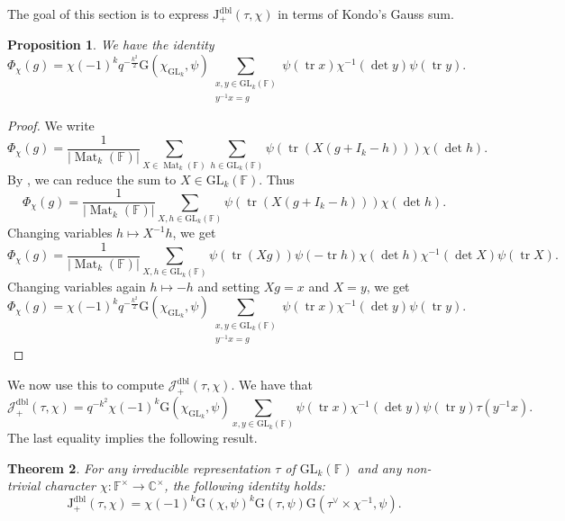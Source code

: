 \documentclass[12pt, reqno]{amsart}
\newtheorem{theorem}{Theorem}[section]
\newtheorem{proposition}[theorem]{Proposition}
\theoremstyle{definition}
\theoremstyle{definition}
\theoremstyle{definition}
\newcommand{\cComplex}{\mathbb{C}}
\newcommand{\multiplicativegroup}[1]{#1^{\times}}
\newcommand{\sizeof}[1]{\left|#1\right|}
\newcommand{\fieldCharacter}{\psi}
\newcommand{\IdentityMatrix}[1]{I_{#1}}
\newcommand{\trace}{\operatorname{tr}}
\newcommand{\GL}{\mathrm{GL}}
\newcommand{\finiteField}{\mathbb{F}}
\newcommand{\squareMatrix}{\operatorname{Mat}}
\newcommand{\posDblJacobiSum}[2]{\mathcal{J}_{+}^{\mathrm{dbl}}\left(#1, #2\right)}
\newcommand{\GaussSumScalar}[2]{\mathrm{G}\left(#1, #2\right)}
\newcommand{\posDblJacobiSumScalar}[2]{\mathrm{J}_{+}^{\mathrm{dbl}}\left(#1, #2\right)}
\begin{document}
The goal of this section is to express $\posDblJacobiSumScalar{\tau}{\chi}$ in terms of Kondo's Gauss sum.

\begin{proposition}\label{prop:doubling-for-gln-in-terms-of-kondo}
	We have the identity
	$$\Phi_{\chi}\left(g\right) = \chi\left(-1\right)^k q^{-\frac{k^2}{2}} \GaussSumScalar{\chi_{\GL_k}}{\fieldCharacter} \sum_{\substack{x, y \in \GL_k\left(\finiteField\right)\\
			y^{-1} x = g}} \fieldCharacter\left(\trace x\right) \chi^{-1}\left(\det y\right) \fieldCharacter\left(\trace y\right).$$
\end{proposition}
\begin{proof}
	We write $$\Phi_{\chi}\left(g\right) = \frac{1}{\sizeof{\squareMatrix_k\left(\finiteField\right)}}\sum_{X \in \squareMatrix_k\left(\finiteField\right)} \sum_{h \in \GL_k\left(\finiteField\right)} \fieldCharacter\left(\trace \left(X\left(g+\IdentityMatrix{k}-h\right)\right)\right) \chi\left(\det h\right).$$
	By , we can reduce the sum to $X \in \GL_k\left(\finiteField\right)$. Thus	$$\Phi_{\chi}\left(g\right) = \frac{1}{\sizeof{\squareMatrix_k\left(\finiteField\right)}} \sum_{X, h \in \GL_k\left(\finiteField\right)} \fieldCharacter\left(\trace \left(X\left(g+\IdentityMatrix{k}-h\right)\right)\right) \chi\left(\det h\right).$$
	Changing variables $h \mapsto X^{-1} h$, we get
	$$\Phi_{\chi}\left(g\right) = \frac{1}{\sizeof{\squareMatrix_k\left(\finiteField\right)}} \sum_{X, h \in \GL_k\left(\finiteField\right)} \fieldCharacter\left(\trace \left(Xg\right)\right) \fieldCharacter\left(-\trace h\right) \chi\left(\det h\right) \chi^{-1}\left(\det X\right) \fieldCharacter\left(\trace X\right).$$
	Changing variables again $h \mapsto -h$ and setting $Xg = x$ and $X = y$, we get  
	$$\Phi_{\chi}\left(g\right) = \chi\left(-1\right)^k q^{-\frac{k^2}{2}} \GaussSumScalar{\chi_{\GL_k}}{\fieldCharacter} \sum_{\substack{x, y \in \GL_k\left(\finiteField\right)\\
			y^{-1} x = g}} \fieldCharacter\left(\trace x\right) \chi^{-1}\left(\det y\right) \fieldCharacter\left(\trace y\right).$$
\end{proof}

We now use this to compute $\posDblJacobiSum{\tau}{\chi}$. We have that $$\posDblJacobiSum{\tau}{\chi} = q^{-k^2} \chi\left(-1\right)^k \GaussSumScalar{\chi_{\GL_k}}{\fieldCharacter} \sum_{x, y \in \GL_k\left(\finiteField\right)} \fieldCharacter\left(\trace x\right) \chi^{-1}\left(\det y\right) \fieldCharacter\left(\trace y\right) \tau\left(y^{-1} x\right).$$
The last equality implies the following result.
\begin{theorem}\label{thm:gln-doubling-gauss-sum-in-terms-of-kondo}For any irreducible representation $\tau$ of $\GL_k\left(\finiteField\right)$ and any non-trivial character $\chi \colon \multiplicativegroup{\finiteField} \to \multiplicativegroup{\cComplex}$, the following identity holds:
	$$\posDblJacobiSumScalar{\tau}{\chi} = \chi\left(-1\right)^k \GaussSumScalar{\chi}{\fieldCharacter}^k \GaussSumScalar{\tau}{\fieldCharacter} \GaussSumScalar{\tau^{\vee} \times \chi^{-1}}{\fieldCharacter}.$$
\end{theorem}
\end{document}
